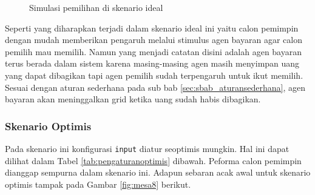 \begin{figure}[H]
	\centering
	\hfill
	\hfill
	\caption{Simulasi pemilihan di skenario ideal}
	\label{fig:simulasi_mesa_ideal}
\end{figure}

Seperti yang diharapkan terjadi dalam skenario ideal ini yaitu calon pemimpin dengan mudah memberikan pengaruh melalui stimulus agen bayaran agar calon pemilih mau memilih. Namun yang menjadi catatan disini adalah agen bayaran terus berada dalam sistem karena masing-masing agen masih menyimpan uang yang dapat dibagikan tapi agen pemilih sudah terpengaruh untuk ikut memilih. Sesuai dengan aturan sederhana pada sub bab \ref{sec:sbab_aturansederhana}, agen bayaran akan meninggalkan grid ketika uang sudah habis dibagikan.

\subsubsection{Skenario Optimis}

Pada skenario ini konfigurasi \texttt{input} diatur seoptimis mungkin. Hal ini dapat dilihat dalam Tabel \ref{tab:pengaturanoptimis} dibawah. Peforma calon pemimpin dianggap sempurna dalam skenario ini. Adapun sebaran acak awal untuk skenario optimis tampak pada Gambar \ref{fig:mesa8} berikut.

